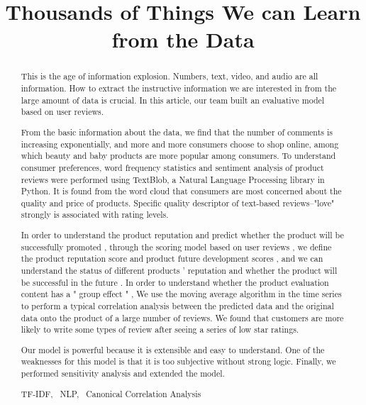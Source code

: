 \documentclass{mcmthesis}
\title{Thousands of Things We can Learn from the Data}
\begin{document}
\begin{abstract}

This is the age of information explosion. Numbers, text, video, and audio are all information. How to extract the instructive information we are interested in from the large amount of data is crucial. In this article, our team built an evaluative model based on user reviews.

From the basic information about the data, we find that the number of comments is increasing exponentially, and more and more consumers choose to shop online, among which beauty and baby products are more popular among consumers. To understand consumer preferences, word frequency statistics and sentiment analysis of product reviews were performed using TextBlob, a Natural Language Processing library in Python. It is found from the word cloud that consumers are most concerned about the quality and price of products. Specific quality descriptor of text-based reviews--"love" strongly is associated with rating levels.

In order to understand the product reputation and predict whether the product will be successfully promoted , through the scoring model based on user reviews , we define the product reputation score and product future development scores , and we can understand the status of different products ' reputation and whether the product will be successful in the future . In order to understand whether the product evaluation content has a " group effect " , We use the moving average algorithm in the time series to perform a typical correlation analysis between the predicted data and the original data onto the product of a large number of reviews. We found that customers are more likely to write some types of review after seeing a series of low star ratings.

Our model is powerful because it is extensible and easy to understand. One of the weaknesses for this model is that it is too subjective without strong logic. Finally, we performed sensitivity analysis and extended the model.
\begin{keywords}
TF-IDF, \ NLP, \ Canonical Correlation Analysis
\end{keywords}
\end{abstract}
\maketitle
\thispagestyle{empty}
\tableofcontents
\end{document}
